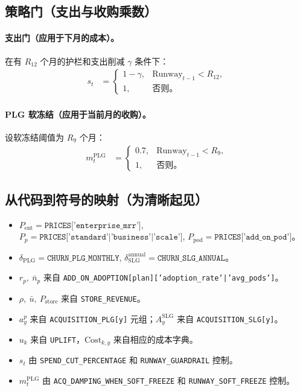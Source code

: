 \documentclass[11点, A4纸, 单面]{article}
\begin{document}
\subsection{策略门（支出与收购乘数）}
\paragraph{支出门（应用于下月的成本）。}
在有 $R_{12}$ 个月的护栏和支出削减 $\gamma$ 条件下：
\begin{align}
s_t 
  &= 
  \begin{cases}
    1-\gamma, & \mathrm{Runway}_{t-1} < R_{12},\\
    1, & \text{否则。}
  \end{cases}
\end{align}

\paragraph{PLG 软冻结（应用于当前月的收购）。}
设软冻结阈值为 $R_{9}$ 个月：
\begin{align}
m^{\mathrm{PLG}}_t 
  &= 
  \begin{cases}
    0.7, & \mathrm{Runway}_{t-1} < R_{9},\\
    1, & \text{否则。}
  \end{cases}
\end{align}

\subsection{从代码到符号的映射（为清晰起见）}
\begin{itemize}
  \item $P_{\mathrm{ent}} = \texttt{PRICES['enterprise\_mrr']}$, $P_p=\texttt{PRICES['standard'|'business'|'scale']}$, $P_{\mathrm{pod}}=\texttt{PRICES['add\_on\_pod']}$。
  \item $\delta_{\mathrm{PLG}}=\texttt{CHURN\_PLG\_MONTHLY}$, $\delta^{\mathrm{annual}}_{\mathrm{SLG}}=\texttt{CHURN\_SLG\_ANNUAL}$。
  \item $r_p,\ \bar{n}_p$ 来自 \texttt{ADD\_ON\_ADOPTION[plan]['adoption\_rate'|'avg\_pods']}。
  \item $\rho,\ \bar{u},\ P_{\mathrm{store}}$ 来自 \texttt{STORE\_REVENUE}。
  \item $a^p_y$ 来自 \texttt{ACQUISITION\_PLG[y]} 元组；$A^{\mathrm{SLG}}_y$ 来自 \texttt{ACQUISITION\_SLG[y]}。
  \item $u_k$ 来自 \texttt{UPLIFT}，$\mathrm{Cost}_{k,y}$ 来自相应的成本字典。
  \item $s_t$ 由 \texttt{SPEND\_CUT\_PERCENTAGE} 和 \texttt{RUNWAY\_GUARDRAIL} 控制。
  \item $m^{\mathrm{PLG}}_t$ 由 \texttt{ACQ\_DAMPING\_WHEN\_SOFT\_FREEZE} 和 \texttt{RUNWAY\_SOFT\_FREEZE} 控制。
\end{itemize}
\end{document}
